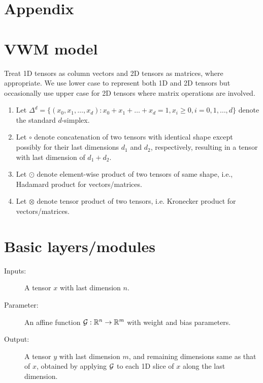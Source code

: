 \section{Appendix}



\section{VWM model}

\begin{notation}
Treat 1D tensors as column vectors and 2D tensors as matrices, where appropriate.
We use lower case to represent both 1D and 2D tensors but occasionally use upper case
for 2D tensors where matrix operations are involved.

\begin{enumerate}
	\item Let 
	$\Delta^d = \{ (x_0, x_1, \dots, x_d) : x_0 + x_1 + \dots + x_d = 1, x_i \ge 0, i = 0, 1, \dots, d\}$ denote the standard $d$-simplex.	
	
	\item  Let $\circ$ denote concatenation of two tensors with identical shape except possibly
	for their last dimensions $d_1$ and $d_2$, respectively,  
	resulting in a tensor with last dimension of $d_1+d_2$. 
	
	\item Let $\odot$ denote  element-wise product of two tensors of same shape,
	i.e., Hadamard product for vectors/matrices.
	
	\item Let $\otimes$ denote tensor product of two tensors, 
	i.e. Kronecker product for vectors/matrices.
\end{enumerate}
\end{notation}	

\section{Basic layers/modules}


\begin{description}
	\item[Inputs:] A tensor $x$ with last dimension $n$.
	\item[Parameter:] An affine function $\mathcal{G}: \mathbb{R}^n \to \mathbb{R}^m$ with 
	weight and bias parameters.
		
	\item[Output:] A tensor $y$ with last dimension $m$, and remaining dimensions
	same as that of $x$, obtained by applying $\mathcal{G}$ to each 1D slice of $x$
	along the last dimension.
	\end{description}


